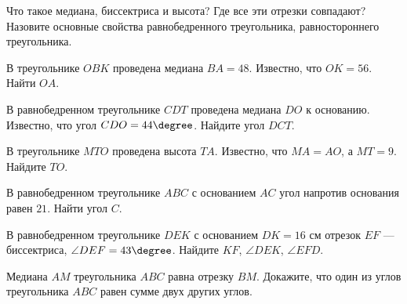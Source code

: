 \begin{class}[number=4]
\begin{listofex}
		\item Что такое медиана, биссектриса и высота? Где все эти отрезки совпадают? Назовите основные свойства равнобедренного треугольника, равностороннего треугольника.
		\item В треугольнике \( OBK \) проведена медиана \( BA=48 \). Известно, что \( OK=56 \). Найти \( OA \).
		\item В равнобедренном треугольнике \( CDT \) проведена медиана \( DO \) к основанию. Известно, что угол \( CDO=44\degree \). Найдите угол \( DCT \).
		\item В треугольнике \( MTO \) проведена высота \( TA \). Известно, что \( MA=AO \), а \( MT=9 \). Найдите \( TO \).
		\item В равнобедренном треугольнике \( ABC \) с основанием \( AC \) угол напротив основания равен \( 21 \). Найти угол \( C \).
		\item В равнобедренном треугольнике \( DEK \) с основанием \( DK=16 \) см отрезок \( EF \) --- биссектриса, \( \angle DEF=43\degree \). Найдите \( KF \), \( \angle DEK \), \( \angle EFD \).
		\item Медиана \( AM \) треугольника \( ABC \) равна отрезку \( BM \). Докажите, что один из углов треугольника \( ABC \) равен сумме двух других углов.
	\end{listofex}
\end{class}
